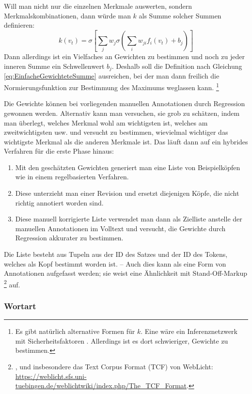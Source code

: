 \documentclass{article}
\renewcommand*{\see}{\autocap{v}gl\adddot}%
\begin{document}
Will man nicht nur die einzelnen Merkmale auswerten, sondern
Merkmalskombinationen, dann würde man $k$ als Summe solcher Summen
definieren:
\begin{equation}
  k(v_t) = \sigma\left[ \sum\limits_jw_j\sigma \left( \sum\limits_iw_{ji}f_i(v_t) +b_j\right)\right]
\end{equation}
Dann allerdings ist ein Vielfaches an Gewichten zu bestimmen und noch
zu jeder inneren Summe ein Schwellenwert $b_j$. Deshalb soll die
Definition nach Gleichung \ref{eq:EinfacheGewichteteSumme} ausreichen,
bei der man dann freilich die Normierungsfunktion zur Bestimmung des
Maximums weglassen kann.%
\footnote{Es gibt natürlich alternative Formen für $k$. Eine wäre ein
  Inferenznetzwerk mit
  Sicherheitsfaktoren \parencite[\see][90--96]{Beierle2014a}. Allerdings
  ist es dort schwieriger, Gewichte zu bestimmen.}

Die Gewichte können bei vorliegenden manuellen Annotationen durch
Regression gewonnen werden. Alternativ kann man versuchen, sie grob zu
schätzen, indem man überlegt, welches Merkmal wohl am wichtigsten ist,
welches am zweitwichtigsten usw. und versucht zu bestimmen,
wievielmal wichtiger das wichtigste Merkmal als die anderen Merkmale
ist. Das läuft dann auf ein hybrides Verfahren für die erste Phase
hinaus:
\begin{enumerate}%
\item Mit den geschätzten Gewichten generiert man eine Liste von
  Beispielköpfen wie in einem regelbasierten Verfahren.
\item Diese unterzieht man einer Revision
  und ersetzt diejenigen Köpfe, die nicht richtig annotiert worden
  sind.
\item Diese manuell korrigierte Liste verwendet man dann als Zielliste
  anstelle der manuellen Annotationen im Volltext und versucht, die
  Gewichte durch Regression akkurater zu bestimmen.
\end{enumerate}
Die Liste besteht aus Tupeln aus der ID des Satzes und der ID des
Tokens, welches als Kopf bestimmt worden ist. -- Auch dies kann als
eine Form von Annotationen aufgefasst werden; sie weist eine
Ähnlichkeit mit Stand-Off-Markup%
\footnote{\Cite[\see\ z.\,B.][575--579]{TEIP5}, und insbesondere das
  Text Corpus Format (TCF) von WebLicht:
  \url{https://weblicht.sfs.uni-tuebingen.de/weblichtwiki/index.php/The_TCF_Format}.} %
auf.


\subsubsection{Wortart}
\end{document}
